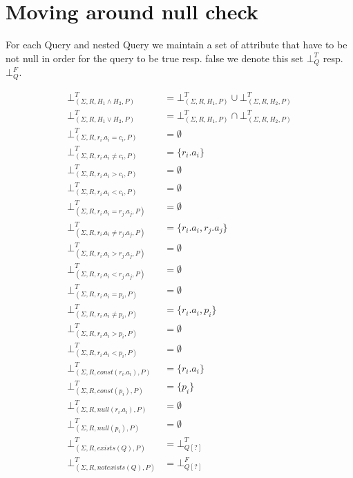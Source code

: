 \section{Moving around null check}

\begin{mydef}
For each Query and nested Query we maintain a set of attribute that have to be not null in order for the query to be true resp. false we denote this set $\bot^T_{Q}$ resp.$\bot^F_{Q}$.
\end{mydef}

\begin{mydef}
	\begin{align*}
		\bot^T_{(\Sigma,R,H_1 \land H_2,P)} & = \bot^T_{(\Sigma,R,H_1,P)} \cup \bot^T_{(\Sigma,R,H_2,P)} \\
		\bot^T_{(\Sigma,R,H_1 \lor H_2,P)} & = \bot^T_{(\Sigma,R,H_1,P)} \cap \bot^T_{(\Sigma,R,H_2,P)} \\
		\bot^T_{(\Sigma,R,r_i.a_i = c_i,P)} & = \emptyset \\
		\bot^T_{(\Sigma,R,r_i.a_i \neq c_i,P)} & = \{r_i.a_i\} \\
		\bot^T_{(\Sigma,R,r_i.a_i > c_i,P)} & = \emptyset \\
		\bot^T_{(\Sigma,R,r_i.a_i < c_i,P)} & = \emptyset \\
		\bot^T_{(\Sigma,R,r_i.a_i = r_j.a_j,P)} & = \emptyset \\
		\bot^T_{(\Sigma,R,r_i.a_i \neq r_j.a_j,P)} & = \{r_i.a_i,r_j.a_j\}\\
		\bot^T_{(\Sigma,R,r_i.a_i > r_j.a_j,P)} & = \emptyset \\
		\bot^T_{(\Sigma,R,r_i.a_i < r_j.a_j,P)} & = \emptyset \\
		\bot^T_{(\Sigma,R,r_i.a_i = p_i,P)} & = \emptyset \\
		\bot^T_{(\Sigma,R,r_i.a_i \neq p_i,P)} & = \{r_i.a_i,p_i\} \\
		\bot^T_{(\Sigma,R,r_i.a_i > p_i,P)} & = \emptyset \\
		\bot^T_{(\Sigma,R,r_i.a_i < p_i,P)} & = \emptyset \\
		\bot^T_{(\Sigma,R,const(r_i.a_i),P)} & = \{r_i.a_i\} \\
		\bot^T_{(\Sigma,R,const(p_i),P)} & = \{p_i\} \\
		\bot^T_{(\Sigma,R,null(r_i.a_i),P)} & = \emptyset \\
		\bot^T_{(\Sigma,R,null(p_i),P)} & = \emptyset \\
		\bot^T_{(\Sigma,R,exists(Q),P)} & = \bot^T_{Q[?]} \\
		\bot^T_{(\Sigma,R,notexists(Q),P)} & = \bot^F_{Q[?]}\\
	\end{align*}
	

\end{mydef}
